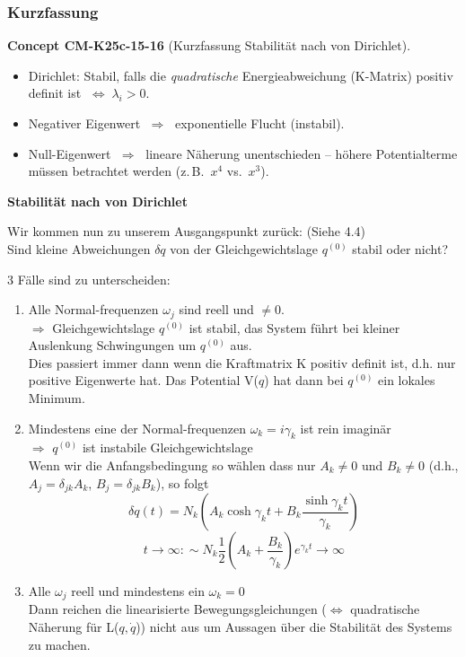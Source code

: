\documentclass[10pt, letterpaper]{article}
\newcommand{\CustomHeading}[3]{%
  \par\medskip\noindent%
  \textbf{#1 #2} \textnormal{(#3)}.\enskip%
}
\newenvironment{CONC}[2]{\begin{unitbox}\CustomHeading{Concept}{#1}{#2}}{\end{unitbox}}
\begin{document}
\subsubsection*{Kurzfassung}

\begin{CONC}{CM-K25c-15-16}{Kurzfassung Stabilität nach von Dirichlet}
\begin{itemize}[leftmargin=*]
\item Dirichlet: Stabil, falls die \emph{quadratische} Energieabweichung
      (K-Matrix) positiv definit ist $\;\Longleftrightarrow\;\lambda_i>0$.
\item Negativer Eigenwert $\;\Longrightarrow\;$ exponentielle Flucht
      (instabil).  
\item Null-Eigenwert $\;\Longrightarrow\;$ lineare Näherung unentschieden –
      höhere Potentialterme müssen betrachtet werden (z.\,B.\ $x^4$ vs.\ $x^3$).
\end{itemize}
\end{CONC}






\textbf{Stabilität nach von Dirichlet}

Wir kommen nun zu unserem Ausgangspunkt zurück: (Siehe 4.4) \\
Sind kleine Abweichungen $\delta q$ von der Gleichgewichtslage $q^{(0)}$ 
stabil oder nicht?

3 Fälle sind zu unterscheiden:

\begin{enumerate}
\item Alle Normal-frequenzen $\omega_j$ sind reell und $\neq 0$.\\
$\Rightarrow$ Gleichgewichtslage $q^{(0)}$ ist stabil, das System führt bei 
kleiner Auslenkung Schwingungen um $q^{(0)}$ aus.\\
Dies passiert immer dann wenn die Kraftmatrix K positiv 
definit ist, d.h. nur positive Eigenwerte hat. Das Potential 
V($q$) hat dann bei $q^{(0)}$ ein lokales Minimum.

\item Mindestens eine der Normal-frequenzen $\omega_k = i\gamma_k$ ist rein imaginär\\
$\Rightarrow$ $q^{(0)}$ ist instabile Gleichgewichtslage\\
Wenn wir die Anfangsbedingung so wählen dass nur 
$A_k \neq 0$ und $B_k \neq 0$ (d.h., $A_j = \delta_{jk} A_k$, $B_j = \delta_{jk} B_k$), so folgt
\[\delta q(t) = N_k \left(A_k \cosh \gamma_k t + B_k \frac{\sinh \gamma_k t}{\gamma_k}\right)\]
\[t \to \infty: \sim N_k \frac{1}{2}\left(A_k + \frac{B_k}{\gamma_k}\right)e^{\gamma_k t} \to \infty\]

\item Alle $\omega_j$ reell und mindestens ein $\omega_k = 0$\\
Dann reichen die linearisierte Bewegungsgleichungen 
($\Leftrightarrow$ quadratische Näherung für L($q,\dot{q}$)) nicht aus um 
Aussagen über die Stabilität des Systems zu machen.
\end{enumerate}
\end{document}

